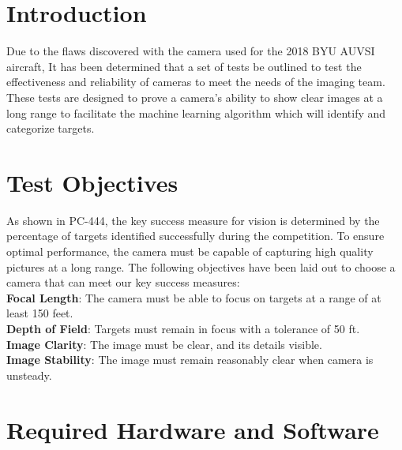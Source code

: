\documentclass[]{auvsi_doc}
\begin{document}
\begin{AUVSITitlePage}
\begin{artifacttable}
\end{artifacttable}
\end{AUVSITitlePage}

\section{Introduction}

Due to the flaws discovered with the camera used for the 2018 BYU AUVSI aircraft, It has been determined that a set of tests be outlined to test the effectiveness and reliability of cameras to meet the needs of the imaging team. These tests are designed to prove a camera’s ability to show clear images at a long range to facilitate the machine learning algorithm which will identify and categorize targets.

\section{Test Objectives}

As shown in PC-444, the key success measure for vision is determined by the percentage of targets identified successfully during the competition. To ensure optimal performance, the camera must be capable of capturing high quality pictures at a long range. The following objectives have been laid out to choose a camera that can meet our key success measures:\\
\textbf{Focal Length}: The camera must be able to focus on targets at a range of at least 150 feet.\\
\textbf{Depth of Field}: Targets must remain in focus with a tolerance of 50 ft.\\
\textbf{Image Clarity}: The image must be clear, and its details visible.\\
\textbf{Image Stability}: The image must remain reasonably clear when camera is unsteady.\\


\section{Required Hardware and Software}
\end{document}
